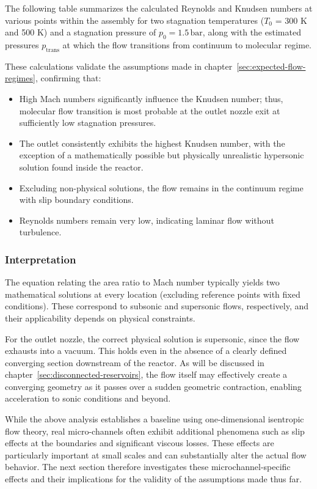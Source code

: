 	The following table summarizes the calculated Reynolds and Knudsen numbers at various points within the assembly for two stagnation temperatures ($T_0$ = 300 K and 500 K) and a stagnation pressure of $p_0 = 1.5\,\text{bar}$, along with the estimated pressures $p_{\text{trans}}$ at which the flow transitions from continuum to molecular regime.

	

	\newpage
	These calculations validate the assumptions made in chapter~\ref{sec:expected-flow-regimes}, confirming that:
	\begin{itemize}
	    \item High Mach numbers significantly influence the Knudsen number; thus, molecular flow transition is most probable at the outlet nozzle exit at sufficiently low stagnation pressures.
	    \item The outlet consistently exhibits the highest Knudsen number, with the exception of a mathematically possible but physically unrealistic hypersonic solution found inside the reactor.
	    \item Excluding non-physical solutions, the flow remains in the continuum regime with slip boundary conditions.
	    \item Reynolds numbers remain very low, indicating laminar flow without turbulence.
	\end{itemize}

\subsubsection*{Interpretation}

	The equation relating the area ratio to Mach number typically yields two mathematical solutions at every location (excluding reference points with fixed conditions).
	These correspond to subsonic and supersonic flows, respectively, and their applicability depends on physical constraints.

	For the outlet nozzle, the correct physical solution is supersonic, since the flow exhausts into a vacuum.
	This holds even in the absence of a clearly defined converging section downstream of the reactor.
	As will be discussed in chapter~\ref{sec:disconnected-reservoirs}, the flow itself may effectively create a converging geometry as it passes over a sudden geometric contraction, enabling acceleration to sonic conditions and beyond.

	While the above analysis establishes a baseline using one-dimensional isentropic flow theory, real micro-channels often exhibit additional phenomena such as slip effects at the boundaries and significant viscous losses.
	These effects are particularly important at small scales and can substantially alter the actual flow behavior.
	The next section therefore investigates these microchannel-specific effects and their implications for the validity of the assumptions made thus far.
